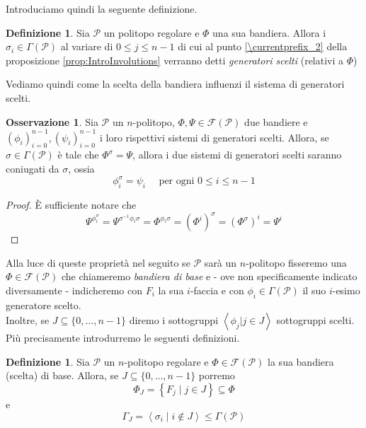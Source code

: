 \documentclass[a4paper,12pt]{report}
\newcommand{\p}{\mathcal{P}}
\theoremstyle{plain}
\theoremstyle{definition}
\newtheorem{defin}[teo]{Definizione}
\newtheorem{oss}[teo]{Osservazione}
\newcommand\localref[1]{\ref{\currentprefix_#1}}
\newcommand\flag[1]{\mathcal{F}(#1)}
\begin{document}
Introduciamo quindi la seguente definizione.
\begin{defin}
Sia $\p$ un politopo regolare e $\Phi$ una sua bandiera. Allora i $\sigma_i\in\Gamma(\p)$ al variare di $0\leq j\leq n-1$ di cui
al punto \localref{2} della proposizione \ref{prop:IntroInvolutions} verranno detti \emph{generatori scelti} (relativi a $\Phi$)
\end{defin}
Vediamo quindi come la scelta della bandiera influenzi il sistema di generatori scelti.
\begin{oss}
\label{oss:GeneratingInvolutions}
Sia $\p$ un $n$-politopo, $\Phi,\Psi\in\flag{\p}$ due bandiere e $(\phi_i)_{i=0}^{n-1}, (\psi_i)_{i=0}^{n-1}$ i loro rispettivi sistemi di
generatori scelti. Allora, se $\sigma\in\Gamma(\p)$ \`e tale che $\Phi^\sigma=\Psi$, allora i due sistemi di generatori scelti saranno coniugati
da $\sigma$, ossia
\begin{equation*}
\phi_i^\sigma=\psi_i\quad\text{ per ogni }0\leq i\leq n-1
\end{equation*}
\end{oss}
\begin{proof}
\`E sufficiente notare che
\begin{equation*}
\Psi^{\phi_i^\sigma}=\Psi^{\sigma^{-1}\phi_i\sigma}=\Phi^{\phi_i\sigma}=(\Phi^i)^\sigma=(\Phi^\sigma)^i=\Psi^i
\end{equation*}
\end{proof}

Alla luce di queste propriet\`a nel seguito se $\p$ sar\`a un $n$-politopo fisseremo una $\Phi\in\flag{\p}$ che chiameremo \emph{bandiera di base}
e - ove non specificamente indicato diversamente - indicheremo con $F_i$ la sua $i$-faccia e con $\phi_i\in\Gamma(\p)$ il suo $i$-esimo generatore
scelto.\\
Inoltre, se $J\subseteq\{0,\dots,n-1\}$ diremo i sottogruppi $\left\langle \phi_j|j\in J\right\rangle$ sottogruppi scelti. Pi\`u precisamente introdurremo
le seguenti definizioni.
\begin{defin}
Sia $\p$ un $n$-politopo regolare e $\Phi\in\flag{\p}$ la sua bandiera (scelta) di base. Allora, se $J\subseteq\{0,\dots,n-1\}$ porremo
\begin{equation*}
\Phi_J=\left\{F_j\mid j\in J\right\}\subseteq\Phi
\end{equation*}
e
\begin{equation*}
\Gamma_J=\left\langle \sigma_i\mid i\notin J\right\rangle\leq \Gamma(\p)
\end{equation*}
\end{defin}
\end{document}

